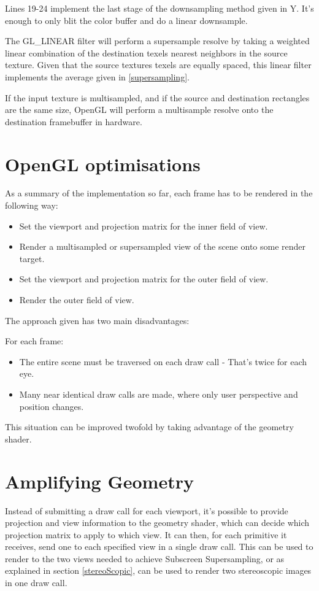 \documentclass[12pt,a4paper,twoside,openright]{report}
\begin{document}
Lines 19-24 implement the last stage of the downsampling method given in Y. It's enough to only blit the color buffer and do a linear downsample. 

The GL\_LINEAR filter will perform a supersample resolve by taking a weighted linear combination of the destination texels nearest neighbors in the source texture. Given that the source textures texels are equally spaced, this linear filter implements the average given in \ref{supersampling}.

If the input texture is multisampled, and if the source and destination rectangles are the same size, OpenGL will perform a multisample resolve onto the destination framebuffer in hardware.

\section{OpenGL optimisations} \label{optimisations}

As a summary of the implementation so far, each frame has to be rendered in the following way:

\begin{itemize}
  \item Set the viewport and projection matrix for the inner field of view.
  \item Render a multisampled or supersampled view of the scene onto some render target.
  \item Set the viewport and projection matrix for the outer field of view.
  \item Render the outer field of view.
\end{itemize}
The approach given has two main disadvantages:

For each frame:
\begin{itemize}
  \item The entire scene must be traversed on each draw call - That's twice for each eye.
  \item Many near identical draw calls are made, where only user perspective and position changes.
\end{itemize}

This situation can be improved twofold by taking advantage of the geometry shader.

\section{Amplifying Geometry}

Instead of submitting a draw call for each viewport, it's possible to provide projection and view information to the geometry shader, which can decide which projection matrix to apply to which view. It can then, for each primitive it receives, send one to each specified view in a single draw call. This can be used to render to the two views needed to achieve Subscreen Supersampling, or as explained in section \ref{stereoScopic}, can be used to render two stereoscopic images in one draw call.
\end{document}

